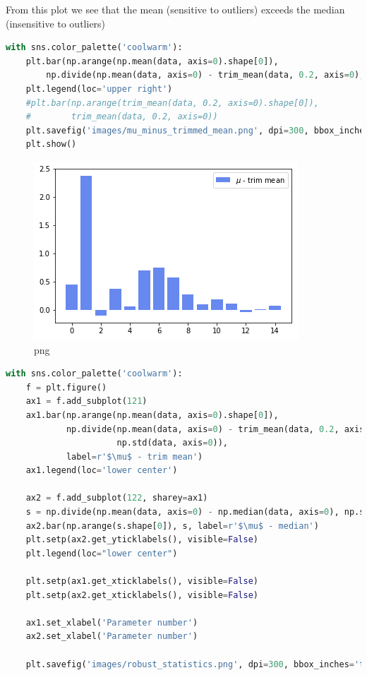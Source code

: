 From this plot we see that the mean (sensitive to outliers) exceeds the
median (insensitive to outliers)

\begin{lstlisting}[language=Python]
with sns.color_palette('coolwarm'):
    plt.bar(np.arange(np.mean(data, axis=0).shape[0]),
        np.divide(np.mean(data, axis=0) - trim_mean(data, 0.2, axis=0), np.std(data, axis=0)), label=r'$\mu$ - trim mean')
    plt.legend(loc='upper right')
    #plt.bar(np.arange(trim_mean(data, 0.2, axis=0).shape[0]),
    #        trim_mean(data, 0.2, axis=0))
    plt.savefig('images/mu_minus_trimmed_mean.png', dpi=300, bbox_inches='tight')
    plt.show()
\end{lstlisting}

\begin{figure}
\centering
\includegraphics{output_37_0.png}
\caption{png}
\end{figure}

\begin{lstlisting}[language=Python]
with sns.color_palette('coolwarm'):
    f = plt.figure()
    ax1 = f.add_subplot(121)
    ax1.bar(np.arange(np.mean(data, axis=0).shape[0]),
            np.divide(np.mean(data, axis=0) - trim_mean(data, 0.2, axis=0),
                      np.std(data, axis=0)), 
            label=r'$\mu$ - trim mean')
    ax1.legend(loc='lower center')
    
    ax2 = f.add_subplot(122, sharey=ax1)
    s = np.divide(np.mean(data, axis=0) - np.median(data, axis=0), np.std(data, axis=0))
    ax2.bar(np.arange(s.shape[0]), s, label=r'$\mu$ - median')
    plt.setp(ax2.get_yticklabels(), visible=False)
    plt.legend(loc="lower center")
    
    plt.setp(ax1.get_xticklabels(), visible=False)
    plt.setp(ax2.get_xticklabels(), visible=False)
    
    ax1.set_xlabel('Parameter number')
    ax2.set_xlabel('Parameter number')
    
    plt.savefig('images/robust_statistics.png', dpi=300, bbox_inches='tight')
    
\end{lstlisting}

